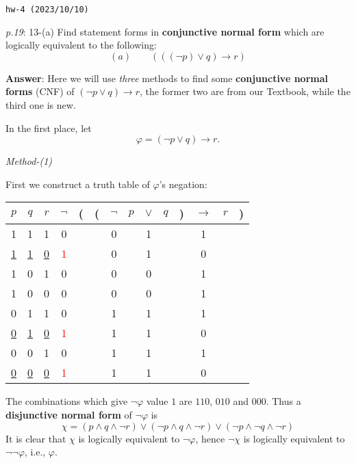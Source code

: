 \documentclass[UTF8,12pt,a4paper]{ctexart}
\begin{document}
\noindent\texttt{hw-4 (2023/10/10)}

\emph{p.19}: 13-(a) \quad
Find statement forms in \textbf{conjunctive normal form} which are logically equivalent to the following:
\[
(a) \qquad (((\neg p)  \lor q) \to r)
\] 

\noindent\textbf{Answer}: 
Here we will use \textit{three} methods to find some \textbf{conjunctive normal forms} (CNF) of $(\neg p \lor q) \to r$, the former two are from our \textsf{Textbook}, while the third one is new.

In the first place, let 
\[
\varphi = (\neg p \lor q) \to r.
\]

\noindent\textit{Method-(1)}

First we construct a truth table of $\varphi$'s {\color{red} negation}:
\begin{center}
	\begin{tabular}{@{ }c@{ }@{ }c@{ }@{ }c | c@{ }@{}c@{}@{}c@{}@{ }c@{ }@{ }c@{ }@{ }c@{ }@{ }c@{ }@{}c@{}@{ }c@{ }@{ }c@{ }@{}c@{ }}
		$p$ & $q$ & $r$ & {\color{red} $\lnot$} & ( & ( & $\lnot$ & $p$ & $\lor$ & $q$ & ) & $\rightarrow$ & $r$ & )\\
		\hline 
		1 & 1 & 1 & 0 &  &  & 0 &  & 1 &  &  & 1 &  & \\
		\underline{1} & \underline{1} & \underline{0} & \textcolor{red}{1} &  &  & 0 &  & 1 &  &  & 0 &  & \\
		1 & 0 & 1 & 0 &  &  & 0 &  & 0 &  &  & 1 &  & \\
		1 & 0 & 0 & 0 &  &  & 0 &  & 0 &  &  & 1 &  & \\
		0 & 1 & 1 & 0 &  &  & 1 &  & 1 &  &  & 1 &  & \\
		\underline{0} & \underline{1} & \underline{0} & \textcolor{red}{1} &  &  & 1 &  & 1 &  &  & 0 &  & \\
		0 & 0 & 1 & 0 &  &  & 1 &  & 1 &  &  & 1 &  & \\
		\underline{0} & \underline{0} & \underline{0} & \textcolor{red}{1} &  &  & 1 &  & 1 &  &  & 0 &  & \\
	\end{tabular}
\end{center}

The combinations which give $\neg \varphi$ value $1$ are $110$, $010$ and $000$. 
Thus a \textbf{disjunctive normal form} of $\neg \varphi$ is
\[
\chi = (p \land q \land \neg r) \lor (\neg p \land q \land \neg r) \lor (\neg p \land  \neg q \land \neg r)
\] 
It is clear that $\chi$ is logically equivalent to $\neg \varphi$, 
hence $\neg \chi $ is  logically equivalent to $ \neg \neg \varphi$, i.e., $\varphi$.
\end{document}
